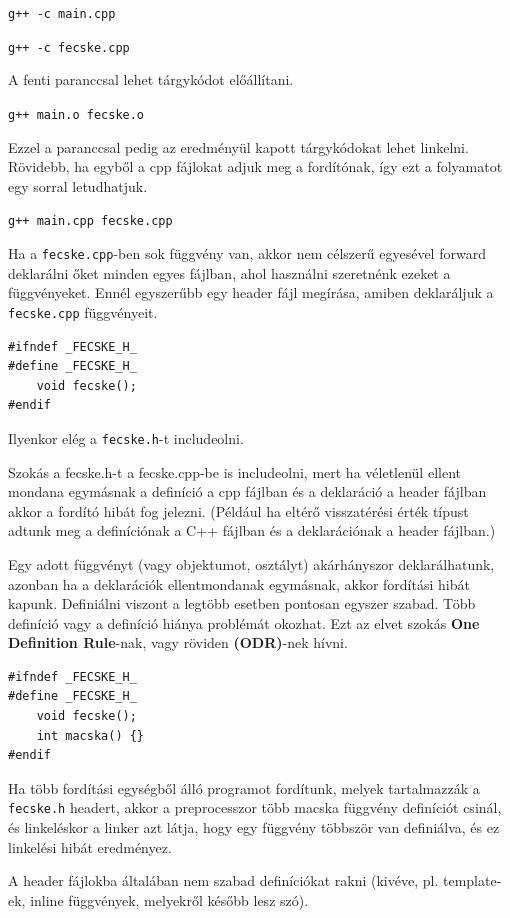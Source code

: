 \documentclass[a4paper,11.5pt,table]{article}
\begin{document}
    {\centering\texttt{g++ -c main.cpp}\par}

	{\centering\texttt{g++ -c fecske.cpp}\par}

	A fenti paranccsal lehet tárgykódot előállítani.
	
	{\centering\texttt{g++ main.o fecske.o}\par}
	
	Ezzel a paranccsal pedig az eredményül kapott tárgykódokat lehet linkelni. Rövidebb, ha egyből a cpp fájlokat adjuk meg a fordítónak, így ezt a folyamatot egy sorral letudhatjuk.

	{\centering\texttt{g++ main.cpp fecske.cpp} \par}
	
	Ha a \texttt{fecske.cpp}-ben sok függvény van, akkor nem célszerű egyesével forward deklarálni őket minden egyes fájlban, ahol használni szeretnénk ezeket a függvényeket. Ennél egyszerűbb egy header fájl megírása, amiben deklaráljuk a \texttt{fecske.cpp} függvényeit.
	\bigskip
	
	\begin{lstlisting}
#ifndef _FECSKE_H_
#define _FECSKE_H_
	void fecske();
#endif
	\end{lstlisting}
	Ilyenkor elég a \texttt{fecske.h}-t includeolni.
	
	Szokás a fecske.h-t a fecske.cpp-be is includeolni, mert ha véletlenül ellent mondana egymásnak a definíció a cpp fájlban és a deklaráció a header fájlban akkor a fordító hibát fog jelezni. (Például ha eltérő visszatérési érték típust adtunk meg a definíciónak a C++ fájlban és a deklarációnak a header fájlban.)
	
	Egy adott függvényt (vagy objektumot, osztályt) akárhányszor deklarálhatunk, azonban ha a deklarációk ellentmondanak egymásnak, akkor fordítási hibát kapunk. Definiálni viszont a legtöbb esetben pontosan egyszer szabad. Több definíció vagy a definíció hiánya problémát okozhat. Ezt az elvet szokás \textbf{One Definition Rule}-nak, vagy röviden \textbf{(ODR)}-nek hívni.
	\bigskip
	
	\begin{lstlisting}
#ifndef _FECSKE_H_
#define _FECSKE_H_
	void fecske();
	int macska() {}
#endif
	\end{lstlisting}
		
	Ha több fordítási egységből álló programot fordítunk, melyek tartalmazzák a \texttt{fecske.h} headert, akkor a preprocesszor több macska függvény definíciót csinál, és linkeléskor a linker azt látja, hogy egy függvény többször van definiálva, és ez linkelési hibát eredményez.
	\begin{note}
		A header fájlokba általában nem szabad definíciókat rakni (kivéve, pl. template-ek, inline függvények, melyekről később lesz szó).
	\end{note}
	
\end{document}
